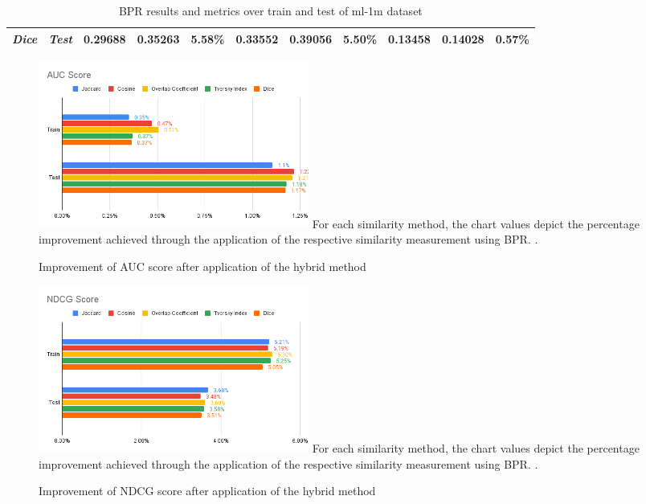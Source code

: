 \documentclass[journal]{IEEEtran}
\begin{document}
\begin{table}[bp]
{\begin{tabular}{|c|c|ccc|ccc|rrc|}
  \textit{Dice}                                 & \textit{Test}                  & \multicolumn{1}{c|}{0.29688}        & \multicolumn{1}{c|}{0.35263}        & \cellcolor[HTML]{F3F3F3}\textbf{5.58\%} & \multicolumn{1}{c|}{0.33552}        & \multicolumn{1}{c|}{0.39056}        & 5.50\%       & \multicolumn{1}{r|}{0.13458}          & \multicolumn{1}{r|}{0.14028}          & \cellcolor[HTML]{F3F3F3}\textbf{0.57\%}                   \\ \hline
  \end{tabular}%
  }
  \caption{BPR results and metrics over train and test of ml-1m dataset}
  \label{table:bpr_scores}
\end{table}

\begin{figure}[!t]
  \centering
  \includegraphics[width=3.5in]{picture/BPR-AUC-Score.png}
  For each similarity method, the chart values depict the percentage improvement achieved through the application of the respective 
  similarity measurement using BPR.
  \DeclareGraphicsExtensions.
  \caption{Improvement of AUC score after application of the hybrid method}
  \label{fig:bpr_auc}
  \end{figure}
  
  \begin{figure}[!t]
  \centering
  \includegraphics[width=3.5in]{picture/BPR-NDCG-Score.png}
  For each similarity method, the chart values depict the percentage improvement achieved through the application of the respective 
  similarity measurement using BPR.
  \DeclareGraphicsExtensions.
  \caption{Improvement of NDCG score after application of the hybrid method}
  \label{fig:bpr_ndcg}
  \end{figure}
\end{document}
